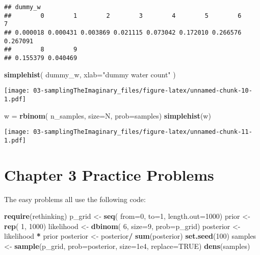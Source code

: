 \documentclass[
]{book}
\newenvironment{Shaded}{\begin{snugshade}}{\end{snugshade}}
\newcommand{\DataTypeTok}[1]{\textcolor[rgb]{0.13,0.29,0.53}{#1}}
\newcommand{\DecValTok}[1]{\textcolor[rgb]{0.00,0.00,0.81}{#1}}
\newcommand{\FloatTok}[1]{\textcolor[rgb]{0.00,0.00,0.81}{#1}}
\newcommand{\KeywordTok}[1]{\textcolor[rgb]{0.13,0.29,0.53}{\textbf{#1}}}
\newcommand{\NormalTok}[1]{#1}
\newcommand{\OperatorTok}[1]{\textcolor[rgb]{0.81,0.36,0.00}{\textbf{#1}}}
\newcommand{\OtherTok}[1]{\textcolor[rgb]{0.56,0.35,0.01}{#1}}
\newcommand{\StringTok}[1]{\textcolor[rgb]{0.31,0.60,0.02}{#1}}
\begin{document}
\begin{verbatim}
## dummy_w
##        0        1        2        3        4        5        6        7 
## 0.000018 0.000431 0.003869 0.021115 0.073042 0.172010 0.266576 0.267091 
##        8        9 
## 0.155379 0.040469
\end{verbatim}

\begin{Shaded}
\begin{Highlighting}[]
\KeywordTok{simplehist}\NormalTok{( dummy_w, }\DataTypeTok{xlab=}\StringTok{"dummy water count"}\NormalTok{ )}
\end{Highlighting}
\end{Shaded}

\texttt{[image: 03-samplingTheImaginary\_files/figure-latex/unnamed-chunk-10-1.pdf]}

\begin{Shaded}
\begin{Highlighting}[]
\NormalTok{w =}\StringTok{ }\KeywordTok{rbinom}\NormalTok{( n_samples, }\DataTypeTok{size=}\NormalTok{N, }\DataTypeTok{prob=}\NormalTok{samples)}
\KeywordTok{simplehist}\NormalTok{(w)}
\end{Highlighting}
\end{Shaded}

\texttt{[image: 03-samplingTheImaginary\_files/figure-latex/unnamed-chunk-11-1.pdf]}

\hypertarget{chapter-3-practice-problems}{%
\section{Chapter 3 Practice Problems}\label{chapter-3-practice-problems}}

The easy problems all use the following code:

\begin{Shaded}
\begin{Highlighting}[]
\KeywordTok{require}\NormalTok{(rethinking)}
\NormalTok{p_grid <-}\StringTok{ }\KeywordTok{seq}\NormalTok{( }\DataTypeTok{from=}\DecValTok{0}\NormalTok{, }\DataTypeTok{to=}\DecValTok{1}\NormalTok{, }\DataTypeTok{length.out=}\DecValTok{1000}\NormalTok{)  }
\NormalTok{prior <-}\StringTok{ }\KeywordTok{rep}\NormalTok{( }\DecValTok{1}\NormalTok{, }\DecValTok{1000}\NormalTok{)  }
\NormalTok{likelihood <-}\StringTok{ }\KeywordTok{dbinom}\NormalTok{( }\DecValTok{6}\NormalTok{, }\DataTypeTok{size=}\DecValTok{9}\NormalTok{, }\DataTypeTok{prob=}\NormalTok{p_grid)  }
\NormalTok{posterior <-}\StringTok{ }\NormalTok{likelihood }\OperatorTok{*}\StringTok{ }\NormalTok{prior  }
\NormalTok{posterior <-}\StringTok{ }\NormalTok{posterior}\OperatorTok{/}\StringTok{ }\KeywordTok{sum}\NormalTok{(posterior) }
\KeywordTok{set.seed}\NormalTok{(}\DecValTok{100}\NormalTok{)}
\NormalTok{samples <-}\StringTok{ }\KeywordTok{sample}\NormalTok{(p_grid, }\DataTypeTok{prob=}\NormalTok{posterior, }\DataTypeTok{size=}\FloatTok{1e4}\NormalTok{, }\DataTypeTok{replace=}\OtherTok{TRUE}\NormalTok{)}
\KeywordTok{dens}\NormalTok{(samples)}
\end{Highlighting}
\end{Shaded}
\end{document}
